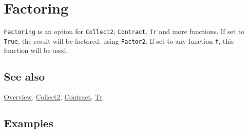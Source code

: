\documentclass[../FeynCalcManual.tex]{subfiles}
\begin{document}
\hypertarget{factoring}{
\section{Factoring}\label{factoring}}

\texttt{Factoring} is an option for \texttt{Collect2},
\texttt{Contract}, \texttt{Tr} and more functions. If set to
\texttt{True}, the result will be factored, using \texttt{Factor2}. If
set to any function \texttt{f}, this function will be used.

\subsection{See also}

\hyperlink{toc}{Overview}, \hyperlink{collect2}{Collect2},
\hyperlink{contract}{Contract}, \hyperlink{tr}{Tr}.

\subsection{Examples}
\end{document}
